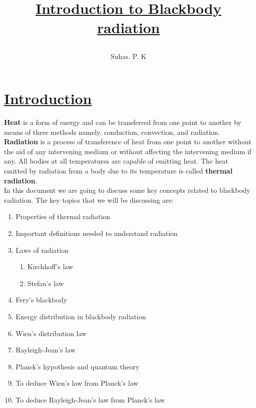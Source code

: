 \documentclass[16pt,a4paper]{article}
\title{\begin{huge}{\textbf{\underline{Introduction to Blackbody radiation}}}\end{huge}}
\author{\begin{large}{Suhas. P. K}\end{large}}
\date{}
\begin{document}
\maketitle


\section*{\underline{Introduction}}
\vspace{0.2cm}
\textbf{Heat} is a form of energy and can be transferred from one point to another by means of three methods namely, conduction, convection, and radiation.
\textbf{Radiation} is a process of transference of heat from one point to another without the aid of any intervening medium or without affecting the intervening medium if any. All bodies at all temperatures are capable of emitting heat. The heat emitted by radiation from a body due to its temperature is called \textbf{thermal radiation}.
\\
In this document we are going to discuss some key concepts related to blackbody radiation. The key topics that we will be discussing are: 
\begin{enumerate}
	\item Properties of thermal radiation
	\item Important definitions needed to understand radiation
	\item Laws of radiation
	\begin{enumerate}
		\item Kirchhoff's law
		\item Stefan's law
	\end{enumerate}
	\item Fery's blackbody
	\item Energy distribution in blackbody radiation
	\item Wien's distribution law
	\item Rayleigh-Jean's law
	\item Planck's hypothesis and quantum theory
	\item To deduce Wien's law from Planck's law
	\item To deduce Rayleigh-Jean's law from Planck's law
\end{enumerate}  

\newpage
\end{document}
